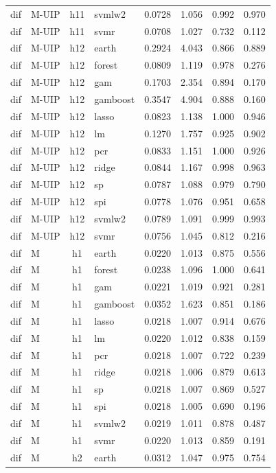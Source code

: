 \begin{ThreePartTable}
\begin{longtable}[t]{llclcccc}
dif & M-UIP & h11 & svmlw2 & 0.0728 & 1.056 & 0.992 & 0.970\\
dif & M-UIP & h11 & svmr & 0.0708 & 1.027 & 0.732 & 0.112\\
\addlinespace
dif & M-UIP & h12 & earth & 0.2924 & 4.043 & 0.866 & 0.889\\
dif & M-UIP & h12 & forest & 0.0809 & 1.119 & 0.978 & 0.276\\
dif & M-UIP & h12 & gam & 0.1703 & 2.354 & 0.894 & 0.170\\
dif & M-UIP & h12 & gamboost & 0.3547 & 4.904 & 0.888 & 0.160\\
dif & M-UIP & h12 & lasso & 0.0823 & 1.138 & 1.000 & 0.946\\
dif & M-UIP & h12 & lm & 0.1270 & 1.757 & 0.925 & 0.902\\
dif & M-UIP & h12 & pcr & 0.0833 & 1.151 & 1.000 & 0.926\\
dif & M-UIP & h12 & ridge & 0.0844 & 1.167 & 0.998 & 0.963\\
dif & M-UIP & h12 & sp & 0.0787 & 1.088 & 0.979 & 0.790\\
dif & M-UIP & h12 & spi & 0.0778 & 1.076 & 0.951 & 0.658\\
dif & M-UIP & h12 & svmlw2 & 0.0789 & 1.091 & 0.999 & 0.993\\
dif & M-UIP & h12 & svmr & 0.0756 & 1.045 & 0.812 & 0.216\\
\addlinespace
dif & M & h1 & earth & 0.0220 & 1.013 & 0.875 & 0.556\\
dif & M & h1 & forest & 0.0238 & 1.096 & 1.000 & 0.641\\
dif & M & h1 & gam & 0.0221 & 1.019 & 0.921 & 0.281\\
dif & M & h1 & gamboost & 0.0352 & 1.623 & 0.851 & 0.186\\
dif & M & h1 & lasso & 0.0218 & 1.007 & 0.914 & 0.676\\
dif & M & h1 & lm & 0.0220 & 1.012 & 0.838 & 0.159\\
dif & M & h1 & pcr & 0.0218 & 1.007 & 0.722 & 0.239\\
dif & M & h1 & ridge & 0.0218 & 1.006 & 0.879 & 0.613\\
dif & M & h1 & sp & 0.0218 & 1.007 & 0.869 & 0.527\\
dif & M & h1 & spi & 0.0218 & 1.005 & 0.690 & 0.196\\
dif & M & h1 & svmlw2 & 0.0219 & 1.011 & 0.878 & 0.487\\
dif & M & h1 & svmr & 0.0220 & 1.013 & 0.859 & 0.191\\
\addlinespace
dif & M & h2 & earth & 0.0312 & 1.047 & 0.975 & 0.754\\

\end{longtable}
\end{ThreePartTable}
